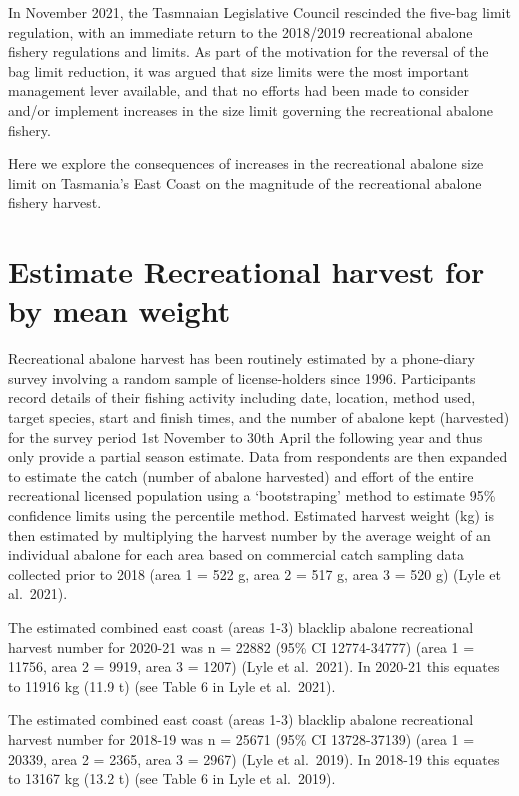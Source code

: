 \documentclass[
  11pt,
]{article}
\begin{document}
In November 2021, the Tasmnaian Legislative Council rescinded the
five-bag limit regulation, with an immediate return to the 2018/2019
recreational abalone fishery regulations and limits. As part of the
motivation for the reversal of the bag limit reduction, it was argued
that size limits were the most important management lever available, and
that no efforts had been made to consider and/or implement increases in
the size limit governing the recreational abalone fishery.

Here we explore the consequences of increases in the recreational
abalone size limit on Tasmania's East Coast on the magnitude of the
recreational abalone fishery harvest.

\section{Estimate Recreational harvest for by mean
weight}\label{estimate-recreational-harvest-for-by-mean-weight}

Recreational abalone harvest has been routinely estimated by a
phone-diary survey involving a random sample of license-holders since
1996. Participants record details of their fishing activity including
date, location, method used, target species, start and finish times, and
the number of abalone kept (harvested) for the survey period 1st
November to 30th April the following year and thus only provide a
partial season estimate. Data from respondents are then expanded to
estimate the catch (number of abalone harvested) and effort of the
entire recreational licensed population using a `bootstraping' method to
estimate 95\% confidence limits using the percentile method. Estimated
harvest weight (kg) is then estimated by multiplying the harvest number
by the average weight of an individual abalone for each area based on
commercial catch sampling data collected prior to 2018 (area 1 = 522 g,
area 2 = 517 g, area 3 = 520 g) (Lyle et al.~2021).

The estimated combined east coast (areas 1-3) blacklip abalone
recreational harvest number for 2020-21 was n = 22882 (95\% CI
12774-34777) (area 1 = 11756, area 2 = 9919, area 3 = 1207) (Lyle et
al.~2021). In 2020-21 this equates to 11916 kg (11.9 t) (see Table 6 in
Lyle et al.~2021).

The estimated combined east coast (areas 1-3) blacklip abalone
recreational harvest number for 2018-19 was n = 25671 (95\% CI
13728-37139) (area 1 = 20339, area 2 = 2365, area 3 = 2967) (Lyle et
al.~2019). In 2018-19 this equates to 13167 kg (13.2 t) (see Table 6 in
Lyle et al.~2019).
\end{document}
